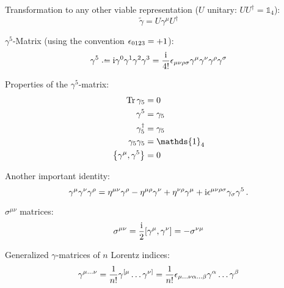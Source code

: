 			\noindent
			Transformation to any other viable representation ($U$ unitary: $U U^\dagger=\mathds{1}_4$):
			\begin{equation}
				\tilde{\gamma} = U \gamma^\mu U^\dagger
			\end{equation}

			\noindent
			$\gamma^5$-Matrix (using the convention $\epsilon_{0123} = +1$):
			\begin{equation}
				\gamma^5 \defeq \i\gamma^0 \gamma^1 \gamma^2 \gamma^3
				= \frac{\i}{4!}\levicivita_{\mu\nu\rho\sigma} \gamma^\mu \gamma^\nu \gamma^\rho \gamma^\sigma
			\end{equation}

			\noindent
			Properties of the $\gamma^5$-matrix:
			\begin{align}
				\tr \gamma_5 &= 0 \\
				\gamma^5 &= \gamma_5 \\
				\gamma_5^\dagger &= \gamma_5 \\
				\gamma_5 \gamma_5 &= \mathds{1}_4 \\
				\acomm{\gamma^\mu}{\gamma^5} &= 0
			\end{align}

			\noindent
			Another important identity:
			\begin{equation}
				\gamma^\mu \gamma^\nu \gamma^\rho = \eta^{\mu\nu}\gamma^\rho - \eta^{\mu\rho} \gamma^{\nu} + \eta^{\nu\rho} \gamma^\mu + \mathrm{i}\epsilon^{\mu\nu\rho\sigma}\gamma_\sigma \gamma^5\,.
			\end{equation}

			\noindent
			$\sigma^{\mu\nu}$ matrices:
			\begin{equation}
				\label{eq:GammaCommutatorMatrix}
				\sigma^{\mu\nu} = \frac{\i}{2}\comm{\gamma^\mu}{\gamma^\nu} = -\sigma^{\nu\mu}
			\end{equation}

			\noindent
			Generalized $\gamma$-matrices of $n$ Lorentz indices:
			\begin{equation}
				\gamma^{\mu\dots\nu} = \frac{1}{n!} \gamma^{[\mu} \dots \gamma^{\nu]}
				= \frac{1}{n!}\epsilon_{\mu\dots\nu\alpha\dots\beta} \gamma^\alpha \dots \gamma^\beta
			\end{equation}

